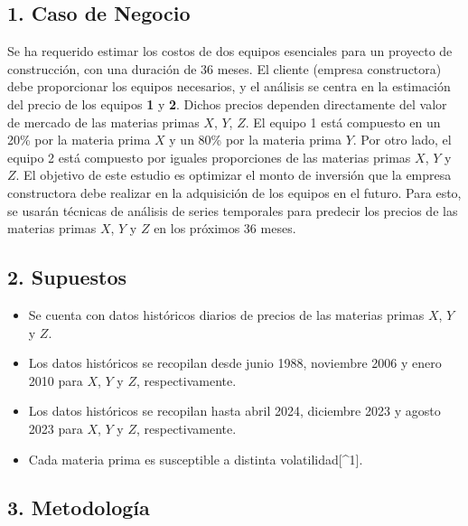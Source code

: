 \subsection{1. Caso de Negocio}\label{caso-de-negocio}

Se ha requerido estimar los costos de dos equipos esenciales para un
proyecto de construcción, con una duración de 36 meses. El cliente
(empresa constructora) debe proporcionar los equipos necesarios, y el
análisis se centra en la estimación del precio de los equipos \textbf{1}
y \textbf{2}. Dichos precios dependen directamente del valor de mercado
de las materias primas \(X\), \(Y\), \(Z\). El equipo 1 está compuesto
en un 20\% por la materia prima \(X\) y un 80\% por la materia prima
\(Y\). Por otro lado, el equipo 2 está compuesto por iguales
proporciones de las materias primas \(X\), \(Y\) y \(Z\). El objetivo de
este estudio es optimizar el monto de inversión que la empresa
constructora debe realizar en la adquisición de los equipos en el
futuro. Para esto, se usarán técnicas de análisis de series temporales
para predecir los precios de las materias primas \(X\), \(Y\) y \(Z\) en
los próximos 36 meses.

\subsection{2. Supuestos}\label{supuestos}

\begin{itemize}
\tightlist
\item
  Se cuenta con datos históricos diarios de precios de las materias
  primas \(X\), \(Y\) y \(Z\).
\item
  Los datos históricos se recopilan desde junio 1988, noviembre 2006 y
  enero 2010 para \(X\), \(Y\) y \(Z\), respectivamente.
\item
  Los datos históricos se recopilan hasta abril 2024, diciembre 2023 y
  agosto 2023 para \(X\), \(Y\) y \(Z\), respectivamente.
\item
  Cada materia prima es susceptible a distinta volatilidad{[}\^{}1{]}.
\end{itemize}

\subsection{3. Metodología}\label{metodologuxeda}

